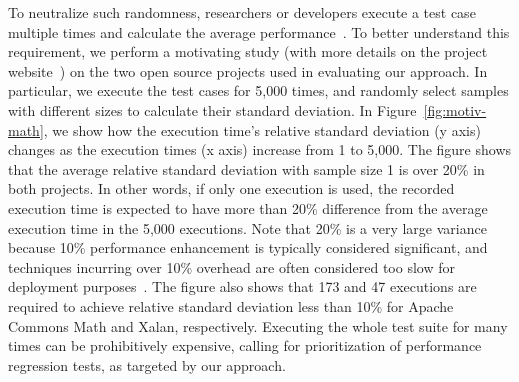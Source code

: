 To neutralize such randomness, researchers or developers execute a test case multiple times and calculate the average performance~\cite{LiuCGO}. To better understand this requirement, we perform a motivating study (with more details on the project website~\cite{perfranker}) on the two open source projects used in evaluating our approach. In particular, we execute the test cases for 5,000 times, and randomly select samples with different sizes to calculate their standard deviation. In Figure~\ref{fig:motiv-math}, we show how the execution time's relative standard deviation (y axis) changes as the execution times (x axis) increase from 1 to 5,000. The figure shows that the average relative standard deviation with sample size 1 is over 20\% in both projects. In other words, if only one execution is used, the recorded execution time is expected to have more than 20\% difference from the average execution time in the 5,000 executions. Note that 20\% is a very large variance because 10\% performance enhancement is typically considered significant, and techniques incurring over 10\% overhead are often considered too slow for deployment purposes~\cite{DoubleTake}. The figure also shows that 173 and 47 executions are required to achieve relative standard deviation less than 10\% for Apache Commons Math and Xalan, respectively. Executing the whole test suite for many times can be prohibitively expensive, calling for prioritization of performance regression tests, as targeted by our approach. 



